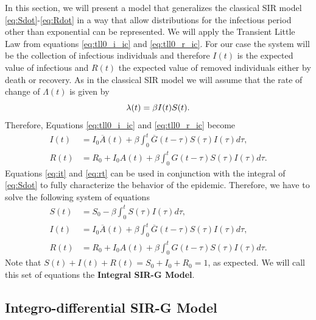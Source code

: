 \documentclass[USenglish,10pt]{article}
\newcommand{\Ab}{\overline{A}\xspace}
\newcommand{\Gb}{\overline{G}\xspace}
\newcommand{\la}{\ensuremath\lambda\xspace}
\begin{document}
In this section, we will present a model that generalizes the classical SIR model \eqref{eq:Sdot}-\eqref{eq:Rdot} in a way that allow distributions for the infectious period other than exponential can be represented.
We will apply the Transient Little Law from equations \eqref{eq:tll0_i_ic} and \eqref{eq:tll0_r_ic}.
For our case the system will be the collection of infectious individuals and therefore $I(t)$ is the expected value of infectious and $R(t)$ the expected value of removed individuals either by death or recovery.
As in the classical SIR model we will assume that the rate of change of $\Lambda(t)$ is given by
\begin{equation}
\la(t) = \beta I(t)S(t).
\label{eq:dM}
\end{equation}
Therefore, Equations \eqref{eq:tll0_i_ic} and \eqref{eq:tll0_r_ic} become
\begin{align}
	I(t) &= I_0\Ab(t) + \beta\int_0^t \Gb(t-\tau) S(\tau)I(\tau)d\tau,   \label{eq:it} \\
	R(t) &= R_0 + I_0A(t) + \beta\int_0^t G(t-\tau) S(\tau)I(\tau)d\tau.   \label{eq:rt}
\end{align}
Equations \eqref{eq:it} and \eqref{eq:rt} can be used in conjunction with the integral of \eqref{eq:Sdot} to fully characterize the behavior of the epidemic. Therefore, we have to solve the following system of equations
\begin{subequations}
\begin{align}
S(t) &= S_0 - \beta\int_0^t  S(\tau)I(\tau)d\tau, \label{eq:st2} \\
I(t) &= I_0 \Ab(t) + \beta\int_0^t \Gb(t-\tau) S(\tau)I(\tau)d\tau, \label{eq:it2} \\
R(t) &= R_0  + I_0A(t) +  \beta\int_0^t G(t-\tau) S(\tau)I(\tau)d\tau.   \label{eq:rt2}
\end{align}
\end{subequations}
Note that $S(t)+I(t)+R(t)=S_0+I_0+R_0=1$, as expected. We will call this set of equations the \textbf{Integral SIR-G Model}.


\subsection{Integro-differential SIR-G Model}
\end{document}

